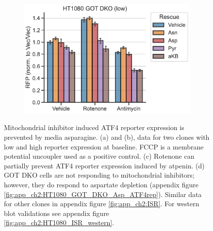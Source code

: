 \begin{figure}
\begin{subfigure}[b]{0.4\textwidth}
         \caption{}
         \label{fig:ch2:143B_Atp_ATF4rep}
     \end{subfigure}
     \hspace{0.06\textwidth}
     \begin{subfigure}[b]{0.4\textwidth}
         \includegraphics[width=\textwidth]{figures/chap2/HT1080_GOT_DKO_ETCinhib_ATF4rep.pdf}
         \caption{}
         \label{fig:ch2:HT1080_GOT_DKO_ETCinhib_ATF4rep}
     \end{subfigure}
        \caption[Mito inhibitor induced ATF4 is rescued by Asn]{
        Mitochondrial inhibitor induced ATF4 reporter expression is prevented by media asparagine.
        (a) and (b), data for two clones with low and high reporter expression at baseline.
        FCCP is a membrane potential uncoupler used as a positive control.
        (c) Rotenone can partially prevent ATF4 reporter expression induced by atpenin.
        (d) GOT DKO cells are not responding to mitochondrial inhibitors; however, they do respond to aspartate depletion (appendix figure \ref{fig:app_ch2:HT1080_GOT_DKO_Asp_ATF4rep}).
        Similar data for other clones in appendix figure \ref{fig:app_ch2:ISR}.
        For western blot validations see appendix figure \ref{fig:app_ch2:HT1080_ISR_western}.
        }
        \label{fig:ch2:ISR}
\end{figure}

